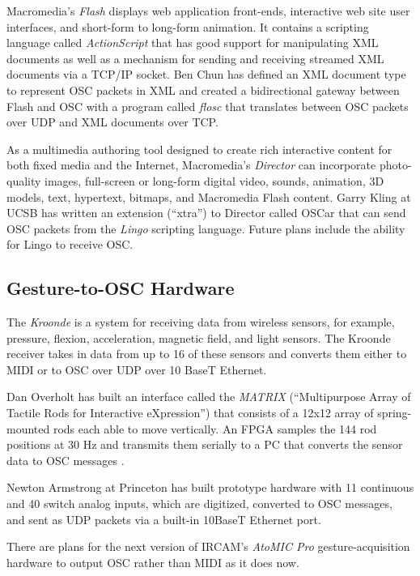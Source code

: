 Macromedia's \textit{Flash }displays web application front-ends, interactive web
site user interfaces, and short-form to long-form animation. It contains a
scripting language called \textit{ActionScript} that has good support for
manipulating XML documents as well as a mechanism for sending and receiving
streamed XML documents via a TCP/IP socket.  Ben Chun has defined an XML document
type to represent OSC packets in XML and created a bidirectional gateway between
Flash and OSC with a program called \textit{flosc} \cite{Chun:2002} that translates between
OSC packets over UDP and XML documents over TCP.

As a multimedia authoring tool designed to create rich interactive content for
both fixed media and the Internet, Macromedia's \textit{Director} can incorporate
photo-quality images, full-screen or long-form digital video, sounds, animation,
3D models, text, hypertext, bitmaps, and Macromedia Flash content. Garry Kling at
UCSB has written an extension (``xtra'') to Director called OSCar \cite{Kling:2002} that can
send OSC packets from the \textit{Lingo} scripting language.  Future plans
include the ability for Lingo to receive OSC.

\subsection{Gesture-to-OSC Hardware}

The \textit{Kroonde}  \cite{Hardware:2002} is a system for receiving data from wireless sensors,
for example, pressure, flexion, acceleration, magnetic field, and light sensors. 
The Kroonde receiver takes in data from up to 16 of these sensors and converts
them either to MIDI or to OSC over UDP over 10 BaseT Ethernet.

Dan Overholt has built an interface called the \textit{MATRIX} (``Multipurpose Array of Tactile Rods for Interactive eXpression'') that consists of a 12x12 array of spring-mounted rods each able to move vertically. An FPGA samples the 144 rod positions at 30 Hz and transmits them serially to a PC that converts the sensor data to OSC messages \cite{Overholt:2001,Overholt:2002}.

Newton Armstrong at Princeton has built prototype hardware %
with 11 continuous and 40 switch analog inputs, which are digitized, converted to OSC messages, and sent as UDP packets via a built-in 10BaseT Ethernet port.

There are plans for the next version of IRCAM's \textit{AtoMIC Pro} gesture-acquisition hardware \cite{Flety:2002} to output OSC rather than MIDI as it does now.

